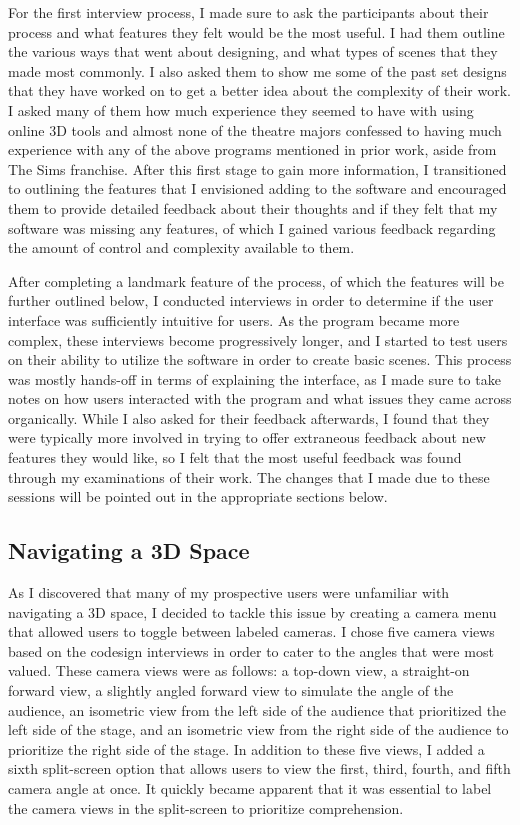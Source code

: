 \documentclass[10pt,twocolumn]{article}
\begin{document}
For the first interview process, I made sure to ask the participants about their process and what features they felt would be the most useful. I had them outline the various ways that went about designing, and what types of scenes that they made most commonly. I also asked them to show me some of the past set designs that they have worked on to get a better idea about the complexity of their work. I asked many of them how much experience they seemed to have with using online 3D tools and almost none of the theatre majors confessed to having much experience with any of the above programs mentioned in prior work, aside from The Sims franchise. After this first stage to gain more information, I transitioned to outlining the features that I envisioned adding to the software and encouraged them to provide detailed feedback about their thoughts and if they felt that my software was missing any features, of which I gained various feedback regarding the amount of control and complexity available to them. 

After completing a landmark feature of the process, of which the features will be further outlined below, I conducted interviews in order to determine if the user interface was sufficiently intuitive for users. As the program became more complex, these interviews become progressively longer, and I started to test users on their ability to utilize the software in order to create basic scenes. This process was mostly hands-off in terms of explaining the interface, as I made sure to take notes on how users interacted with the program and what issues they came across organically. While I also asked for their feedback afterwards, I found that they were typically more involved in trying to offer extraneous feedback about new features they would like, so I felt that the most useful feedback was found through my examinations of their work. The changes that I made due to these sessions will be pointed out in the appropriate sections below. 

\subsection{Navigating a 3D Space}
As I discovered that many of my prospective users were unfamiliar with navigating a 3D space, I decided to tackle this issue by creating a camera menu that allowed users to toggle between labeled cameras. I chose five camera views based on the codesign interviews in order to cater to the angles that were most valued. These camera views were as follows: a top-down view, a straight-on forward view, a slightly angled forward view to simulate the angle of the audience, an isometric view from the left side of the audience that prioritized the left side of the stage, and an isometric view from the right side of the audience to prioritize the right side of the stage. In addition to these five views, I added a sixth split-screen option that allows users to view the first, third, fourth, and fifth camera angle at once. It quickly became apparent that it was essential to label the camera views in the split-screen to prioritize comprehension.
\end{document}
